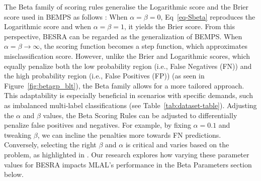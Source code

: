 \documentclass[letterpaper]{article} %
\begin{document}
The Beta family of scoring rules generalise the Logarithmic score and the Brier score used in BEMPS as follows \cite{merkle2013choosing}:
When $\alpha=\beta=0$, Eq~\eqref{eq-Sbeta} reproduces the Logarithmic score
and when $\alpha=\beta=1$, it yields the Brier score.
From this perspective, BESRA can be regarded as the generalization of BEMPS.
When $\alpha = \beta \rightarrow \infty$, the scoring function becomes a step function, which approximates misclassification score.
However, unlike the Brier and Logarithmic scores, which equally penalize both the low probability region (i.e., False Negatives (FN)) and the high probability region (i.e., False Positives (FP)) (as seen in Figure~\ref{fig:betagp_blt}), the Beta family allows for a more tailored approach.
This adaptability is especially beneficial in scenarios with specific demands, such as imbalanced multi-label classifications (see Table~\ref{tab:dataset-table}).
Adjusting the $\alpha$ and $\beta$ values, the Beta Scoring Rules can be adjusted to differentially penalize false positives and negatives.
For example, by fixing $\alpha=0.1$ and tweaking $\beta$, we can incline the penalties more towards FN predictions.
Conversely, selecting the right $\beta$ and $\alpha$ is critical and varies based on the problem, as highlighted in \citep{merkle2013choosing, doi:10.1198/016214506000001437}. Our research explores how varying these parameter values for BESRA impacts MLAL's performance in the Beta Parameters section below.
\end{document}
